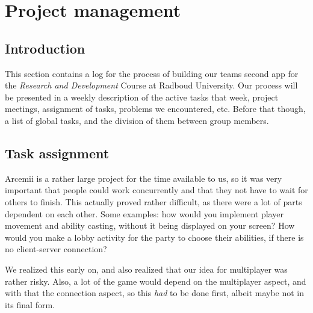 \documentclass[../main.tex]{subfiles}
\begin{document}
\pagebreak
\section{Project management}
\subsection*{Introduction}
This section contains a log for the process of building our teams second app for the \textit{Research and Development} Course at Radboud University.
Our process will be presented in a weekly description of the active tasks that week, project meetings, assignment of tasks, problems we encountered, etc. Before that though, a list of global tasks, and the division of them between group members.

\subsection{Task assignment}
Arcemii is a rather large project for the time available to us, so it was very important that people could work concurrently and that they not have to wait for others to finish. This actually proved rather difficult, as there were a lot of parts dependent on each other. Some examples: how would you implement player movement and ability casting, without it being displayed on your screen? How would you make a lobby activity for the party to choose their abilities, if there is no client-server connection?

We realized this early on, and also realized that our idea for multiplayer was rather risky. Also, a lot of the game would depend on the multiplayer aspect, and with that the connection aspect, so this \textit{had} to be done first, albeit maybe not in its final form.
\end{document}
